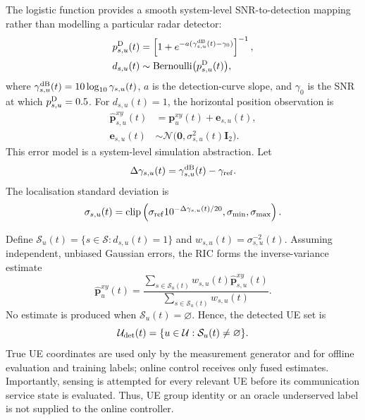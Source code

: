 The logistic function provides a smooth system-level SNR-to-detection
mapping rather than modelling a particular radar detector:
\begin{align}
 p^{\rm D}_{s,u}(t)&=
 \left[1+e^{-a(\gamma^{\rm dB}_{s,u}(t)-\gamma_0)}\right]^{-1},\\
 d_{s,u}(t)&\sim\operatorname{Bernoulli}
 \bigl(p^{\rm D}_{s,u}(t)\bigr),
 \label{eq:isac-detection-compact}
\end{align}
where $\gamma^{\rm dB}_{s,u}(t)=10\log_{10}\gamma_{s,u}(t)$,
$a$ is the detection-curve slope, and $\gamma_0$ is the SNR at which
$p^{\rm D}_{s,u}=0.5$. For $d_{s,u}(t)=1$, the horizontal
position observation is
\begin{align}
 \widehat{\mathbf{p}}^{xy}_{s,u}(t)
 &=\mathbf{p}^{xy}_u(t)+\mathbf{e}_{s,u}(t),
 \label{eq:isac-position}\\
 \mathbf{e}_{s,u}(t)&\sim\mathcal{N}
 \bigl(\mathbf{0},\sigma_{s,u}^2(t)\mathbf{I}_2\bigr).
\end{align}
This error model is a system-level simulation abstraction. Let
\begin{equation}
 \Delta\gamma_{s,u}(t)=
 \gamma^{\rm dB}_{s,u}(t)-\gamma_{\rm ref}.
\end{equation}
The localisation standard deviation is
\begin{equation}
 \sigma_{s,u}(t)=\operatorname{clip}
 \left(\sigma_{\rm ref}10^{-\Delta\gamma_{s,u}(t)/20},
 \sigma_{\min},\sigma_{\max}\right).
 \label{eq:isac-error-compact}
\end{equation}

Define $\mathcal{S}_u(t)=\{s\in\mathcal{S}:d_{s,u}(t)=1\}$ and
$w_{s,u}(t)=\sigma_{s,u}^{-2}(t)$. Assuming independent, unbiased
Gaussian errors, the RIC forms the inverse-variance estimate
\begin{equation}
 \widehat{\mathbf{p}}^{xy}_u(t)=
 \frac{\sum_{s\in\mathcal{S}_u(t)}w_{s,u}(t)
 \widehat{\mathbf{p}}^{xy}_{s,u}(t)}
 {\sum_{s\in\mathcal{S}_u(t)}w_{s,u}(t)}.
 \label{eq:isac-fusion-compact}
\end{equation}
No estimate is produced when $\mathcal{S}_u(t)=\varnothing$. Hence,
the detected UE set is
\begin{equation}
 \mathcal{U}_{\rm det}(t)=
 \{u\in\mathcal{U}:\mathcal{S}_u(t)\neq\varnothing\}.
 \label{eq:detected-set}
\end{equation}
True UE coordinates are used only by the measurement generator and
for offline evaluation and training labels; online control receives
only fused estimates.
Importantly, sensing is attempted for every relevant UE before its
communication service state is evaluated. Thus, UE group identity or
an oracle underserved label is not supplied to the online controller.

